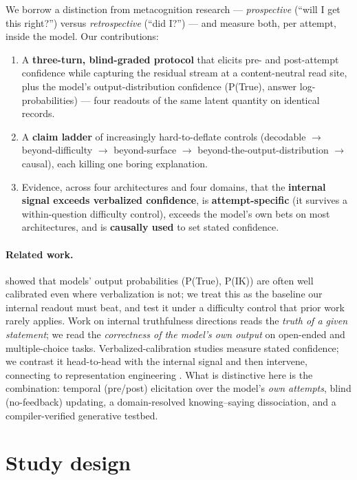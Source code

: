 \documentclass{article}
\begin{document}
We borrow a distinction from metacognition research --- \emph{prospective} (``will I get this right?'') versus \emph{retrospective} (``did I?'') --- and measure both, per attempt, inside the model.
Our contributions:
\begin{enumerate}
  \item A \textbf{three-turn, blind-graded protocol} that elicits pre- and post-attempt confidence while capturing the residual stream at a content-neutral read site, plus the model's output-distribution confidence (P(True), answer log-probabilities) --- four readouts of the same latent quantity on identical records.
  \item A \textbf{claim ladder} of increasingly hard-to-deflate controls (decodable $\to$ beyond-difficulty $\to$ beyond-surface $\to$ beyond-the-output-distribution $\to$ causal), each killing one boring explanation.
  \item Evidence, across four architectures and four domains, that the \textbf{internal signal exceeds verbalized confidence}, is \textbf{attempt-specific} (it survives a within-question difficulty control), exceeds the model's own bets on most architectures, and is \textbf{causally used} to set stated confidence.
\end{enumerate}

\paragraph{Related work.}
\citet{kadavath2022language} showed that models' output probabilities (P(True), P(IK)) are often well calibrated even where verbalization is not; we treat this as the baseline our internal readout must beat, and test it under a difficulty control that prior work rarely applies.
Work on internal truthfulness directions \citep{azaria2023internal, marks2024geometry, burns2023discovering} reads the \emph{truth of a given statement}; we read the \emph{correctness of the model's own output} on open-ended and multiple-choice tasks.
Verbalized-calibration studies \citep{lin2022teaching, tian2023just} measure stated confidence; we contrast it head-to-head with the internal signal and then intervene, connecting to representation engineering \citep{zou2023representation}.
What is distinctive here is the combination: temporal (pre/post) elicitation over the model's \emph{own attempts}, blind (no-feedback) updating, a domain-resolved knowing--saying dissociation, and a compiler-verified generative testbed.

\section{Study design}
\label{sec:methods}
\end{document}
